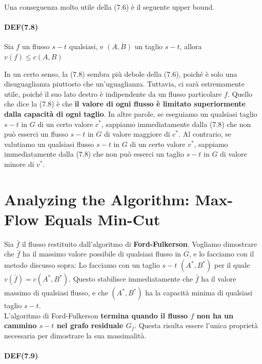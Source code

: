 Una conseguenza molto utile della (7.6) è il seguente upper bound.


\paragraph{DEF(7.8)}

\begin{myblockquote}
	Sia $f$ un flusso $s-t$ qualsiasi, e $(A, B)$ un taglio $s-t$, allora
	$
		v(f) \le c(A, B)
	$
\end{myblockquote}

In un certo senso, la (7.8) sembra più debole della (7.6), poiché è solo
una disuguaglianza piuttosto che un'uguaglianza. Tuttavia, ci sarà
estremamente utile, poiché il suo lato destro è indipendente da un
flusso particolare $f$. Quello che dice la (7.8) è che \textbf{il
	valore di ogni flusso è limitato superiormente dalla capacità di ogni
	taglio}. In altre parole, se eseguiamo un qualsiasi taglio $s-t$ in
$G$ di un certo valore $c^{*}$, sappiamo immediatamente dalla (7.8)
che non può esserci un flusso $s-t$ in $G$ di valore maggiore di
$c^{*}$. Al contrario, se valutiamo un qualsiasi flusso $s-t$ in $G$
di un certo valore $v^{*}$, sappiamo immediatamente dalla (7.8) che non
può esserci un taglio $s-t$ in $G$ di valore minore di $v^{*}$.

\section{Analyzing the Algorithm: Max-Flow Equals Min-Cut}

Sia $\bar{f}$ il flusso restituito dall'algoritmo di
\textbf{Ford-Fulkerson}. Vogliamo dimostrare che $\bar{f}$ ha il
massimo valore possibile di qualsiasi flusso in $G$, e lo facciamo con
il metodo discusso sopra: Lo facciamo con un taglio $s-t$
$(A^{*} , B^{*})$ per il quale $v(\bar{f}) = c(A^{*} , B^{*})$. Questo
stabilisce immediatamente che $\bar{f}$ ha il valore massimo di
qualsiasi flusso, e che $(A^{*} , B^{*})$ ha la capacità minima di
qualsiasi taglio $s-t$.\\

L'algoritmo di Ford-Fulkerson \textbf{termina quando il flusso $f$ non
	ha un cammino $s-t$ nel grafo residuale $G_f$}. Questa risulta
essere l'unica proprietà necessaria per dimostrare la sua massimalità.\\

\paragraph{DEF(7.9)}

